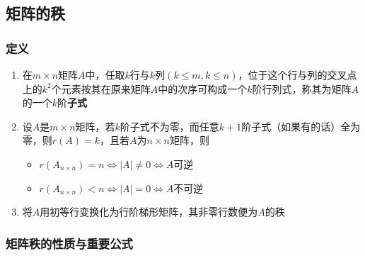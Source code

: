 \documentclass[./linear_algebra.tex]{subfiles}
\begin{document}
    \subsection{矩阵的秩}

    \subsubsection{定义}

    \begin{enumerate}
        \item 在$m \times n$矩阵$A$中，任取$k$行与$k$列$(k \le m, k \le n)$，位于这个行与列的交叉点上的$k^2$个元素按其在原来矩阵$A$中的次序可构成一个$k$阶行列式，称其为矩阵$A$的一个$k$阶\textbf{子式}
        \item 设$A$是$m\times n$矩阵，若{\color{blue}{存在}}$k$阶子式不为零，而任意$k + 1$阶子式（如果有的话）全为零，则$r(A) = k$，且若$A$为$n\times n$矩阵，则
        \begin{itemize}
            \item $r(A_{n\times n}) = n \Leftrightarrow |A| \neq 0 \Leftrightarrow A\text{可逆}$
            \item $r(A_{n\times n}) < n \Leftrightarrow |A| = 0 \Leftrightarrow A\text{不可逆}$
        \end{itemize}
        \item 将$A$用初等行变换化为行阶梯形矩阵，其非零行数便为$A$的秩
    \end{enumerate}

    \subsubsection{矩阵秩的性质与重要公式}
\end{document}

